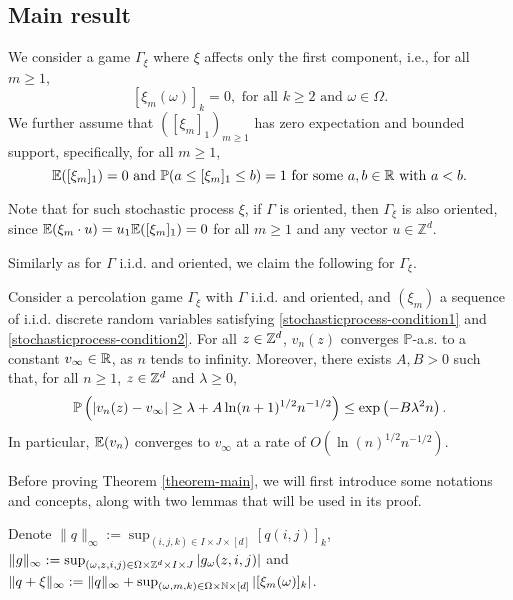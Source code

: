 	\subsection{Main result}
	We consider a game $\Gamma_{\xi}$ where $\xi$ affects only the first component, i.e., for all $m \geq 1$,
	\begin{equation}\label{stochasticprocess-condition1}
	 	[\xi_m(\omega)]_k = 0, \text{ for all } k \geq 2 \text{ and } \omega \in \Omega.
	\end{equation} 
	\noindent We further assume that $([\xi_m]_1)_{m \geq 1}$ has zero expectation and bounded support, specifically, for all $m \geq 1$,
	\begin{equation}\label{stochasticprocess-condition2}
    	\mathbb{E}([\xi_m]_1) = 0 \text{ and } \mathbb{P}(a \leq [\xi_m]_1 \leq b) = 1 \text{ for some } a, b \in \mathbb{R} \text{ with } a < b.
	\end{equation}

	Note that for such stochastic process $\xi$, if $\Gamma$ is oriented, then $\Gamma_{\xi}$ is also oriented, since $\mathbb{E}(\xi_m \cdot u) = u_1 \mathbb{E}([\xi_m]_1) = 0$ for all $m \geq 1$ and any vector $u \in \mathbb{Z}^d$.

	Similarly as for $\Gamma$ i.i.d. and oriented, we claim the following for $\Gamma_{\xi}$.
	
	\begin{theorem} \label{theorem-main}
		Consider a percolation game $\Gamma_{\xi}$ with $\Gamma$ i.i.d. and oriented, and $(\xi_m)$ a sequence of i.i.d. discrete random variables satisfying \eqref{stochasticprocess-condition1} and \eqref{stochasticprocess-condition2}. For all $z \in \mathbb{Z}^d$, $v_n(z)$ converges $\mathbb{P}$-a.s. to a constant $v_{\infty} \in \mathbb{R}$, as $n$ tends to infinity. Moreover, there exists $A, B > 0$ such that, for all $n \geq 1$, $z \in \mathbb{Z}^d$ and $\lambda \geq 0$,
		\begin{equation}\label{theorem-rate-of-Lonvergence}
			\mathbb{P}\left(|v_n(z) - v_{\infty}| \geq \lambda + A\ln(n+1)^{1/2}n^{-1/2}\right) \leq \exp\left(-B\lambda^2n\right).
		\end{equation}
		In particular, $\mathbb{E}(v_n)$ converges to $v_{\infty}$ at a rate of $O(\ln(n)^{1/2}n^{-1/2})$.
	\end{theorem}
		
	Before proving Theorem \ref{theorem-main}, we will first introduce some notations and concepts, along with two lemmas that will be used in its proof.

	Denote $\|q\|_{\infty} := \sup_{(i, j, k) \in I \times J \times [d]} [q(i, j)]_k$, $\|g\|_{\infty} := \sup_{(\omega, z, i, j) \in \Omega \times \mathbb{Z}^d \times I \times J} |g_{\omega}(z, i, j)|$ and $\|q + \xi\|_{\infty} := \|q\|_{\infty} + \sup_{(\omega, m, k) \in \Omega  \times \mathbb{N} \times [d]}|[\xi_m(\omega)]_k|$. 
	

